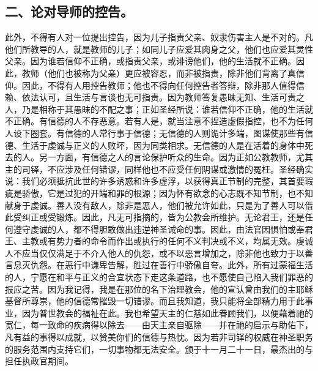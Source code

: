 
\subsection{二、论对导师的控告。}

此外，不得有人对一位提出控告，因为儿子指责父亲、奴隶伤害主人是不对的。凡他们所教导的人，就是教师的儿子；如同儿子应爱其肉身之父，他们也应爱其灵性父亲。因为谁若信仰不正确，或指责父亲，或诽谤他们，他的生活就不正确。因此，教师（他们也被称为父亲）更应被容忍，而非被指责，除非他们背离了真信仰。因此，不得有人用控告教师；他也不得向任何控告者答辩，除非那人值得信赖、依法认可，且生活与言谈也无可指责。因为教师答复愚昧无知、生活可责之人，乃是相称于其愚昧的不配之事；正如圣经所说：谁若信仰不正确，他的生活就不正确。有信德的人不存恶意。若有人是，就当注意不捏造虚假指控，也不为任何人设下圈套。有信德的人常行事于信德；无信德的人则诡计多端，图谋使那些有信德、生活于虔诚与正义的人败坏，因为同类相求。无信德的人是在活着的身体中死去的人。另一方面，有信德之人的言论保护听众的生命。因为正如公教教师，尤其主的司铎，不应涉及任何错谬，同样他也不应受任何阴谋或激情的冤枉。圣经确实说：我们必须抵抗此世的许多诱惑和许多虚浮，以获得真正节制的完整，其首要瑕疵是骄傲，它是过犯的开端和罪的根源；因为怀有欲念的心志既不知节制，也不知献身于虔诚。善人没有敌人，除非是恶人，他们被允许如此，只是为了善人可以借此受纠正或受锻炼。因此，凡无可指摘的，皆为公教会所维护。无论君王，还是任何遵守虔诚的人，都不得胆敢做出违逆神圣诫命的事。因此，由法官因惧怕或奉君王、主教或有势力者的命令而作出或执行的任何不义判决或不义，均属无效。虔诚人不应当仅仅满足于不介入他人的仇怨，或不以恶言增加之，除非他也致力于以善言息灭仇怨。在恶行中谦卑告解，胜过在善行中骄傲自夸。此外，所有过蒙福生活的人，宁愿在和平与正义的合宜状态下走这条道路，也不愿使自己陷入我们罪恶的报应之苦。因为我记得，我是在那位的名下治理教会，他的宣认曾由我们的主耶稣基督所尊崇，他的信德常摧毁一切错谬。而且我知道，我只能将全部精力用于此事业，因为普世教会的福祉在此。我也希望天主的仁慈如此眷顾我们，以便藉着祂的宽仁，每一致命的疾病得以除去——由天主亲自驱除——并在祂的启示与助佑下，凡有益的事得以成就，以赞美你们的信德与热忱。因为若非司铎的权威在神圣职务的服务范围内支持它们，一切事物都无法安全。颁于十一月二十一日，最杰出的与担任执政官期间。\par

